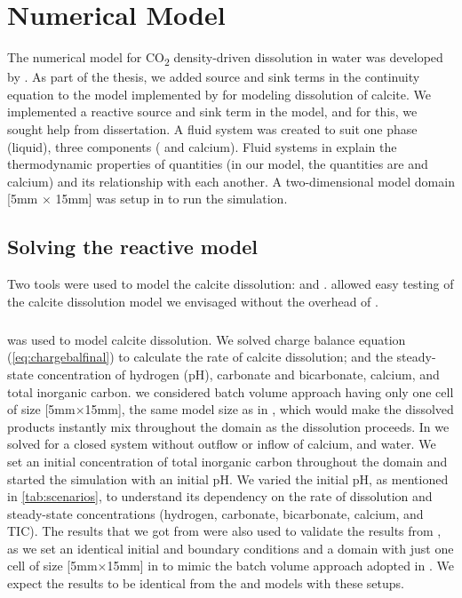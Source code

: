 \chapter{Numerical Model}\label{chapter:numericalmodel}
\thispagestyle{empty}

The numerical model for CO\textsubscript{2} density-driven dissolution in water was developed by 
\citet{Class2020}. As part of the thesis, we added source and sink terms in the continuity equation 
to the  model implemented by \citet{Class2020} for modeling dissolution of calcite. We implemented a 
reactive source and sink term in the model, and for this, we sought help from \citet{hommel2016modeling} dissertation. 
A fluid system was created to suit one phase (liquid), three components ( and calcium). 
Fluid systems in \DuMuX explain the thermodynamic properties of quantities (in our model, the quantities are 
 and calcium) and its relationship with each another. A two-dimensional model domain [5mm $\times$ 15mm] 
was setup in \DuMuX to run the simulation.

\section{Solving the reactive model}
Two tools were used to model the calcite dissolution: \MATLAB and \DuMuX. \MATLAB allowed easy testing of the 
calcite dissolution model we envisaged without the overhead of \DuMuX.

\paragraph*{\MATLAB} was used to model calcite dissolution. We solved charge balance equation (\ref{eq:chargebalfinal}) 
to calculate the rate of calcite dissolution; and the steady-state concentration of hydrogen (pH), carbonate and bicarbonate, 
calcium, and total inorganic carbon. we considered batch volume approach having only one cell of size [5mm$\times$15mm], 
the same model size as in \DuMuX , which would make the dissolved products instantly mix throughout the domain as 
the dissolution proceeds. In \MATLAB we solved for a closed system without outflow or inflow of calcium,  and water. 
We set an initial concentration of total inorganic carbon throughout the domain and started the simulation with an initial pH. 
We varied the initial pH, as mentioned in \cref{tab:scenarios}, to understand its dependency on the rate of dissolution and 
steady-state concentrations (hydrogen, carbonate, bicarbonate, calcium, and TIC). The results that we got from \MATLAB were 
also used to validate the results from \DuMuX, as we set an identical initial and boundary conditions and a domain with just 
one cell of size [5mm$\times$15mm] in \DuMuX to mimic the batch volume approach adopted in \MATLAB. We expect the results 
to be identical from the \MATLAB and \DuMuX models with these setups. \\

